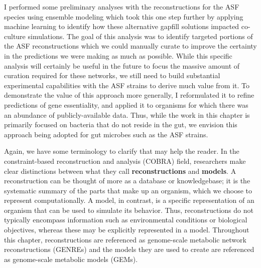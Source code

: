 \documentclass[11pt,onecolumn,notitlepage,openany,twoside]{book}
\begin{document}
\begin{refsection}
I performed some preliminary analyses with the reconstructions for the ASF species using ensemble modeling which took this one step further by applying machine learning to identify how these alternative gapfill solutions impacted co-culture simulations. The goal of this analysis was to identify targeted portions of the ASF reconstructions which we could manually curate to improve the certainty in the predictions we were making as much as possible. While this specific analysis will certainly be useful in the future to focus the massive amount of curation required for these networks, we still need to build substantial experimental capabilities with the ASF strains to derive much value from it. To demonstrate the value of this approach more generally, I reformulated it to refine predictions of gene essentiality, and applied it to organisms for which there was an abundance of publicly-available data. Thus, while the work in this chapter is primarily focused on bacteria that do not reside in the gut, we envision this approach being adopted for gut microbes such as the ASF strains.

Again, we have some terminology to clarify that may help the reader. In the constraint-based reconstruction and analysis (COBRA) field, researchers make clear distinctions between what they call \textbf{reconstructions} and \textbf{models}. A reconstruction can be thought of more as a database or knowledgebase; it is the systematic summary of the parts that make up an organism, which we choose to represent computationally. A model, in contrast, is a specific representation of an organism that can be used to simulate its behavior. Thus, reconstructions do not typically encompass information such as environmental conditions or biological objectives, whereas these may be explicitly represented in a model. Throughout this chapter, reconstructions are referenced as genome-scale metabolic network reconstructions (GENREs) and the models they are used to create are referenced as genome-scale metabolic models (GEMs).


\end{refsection}
\end{document}
